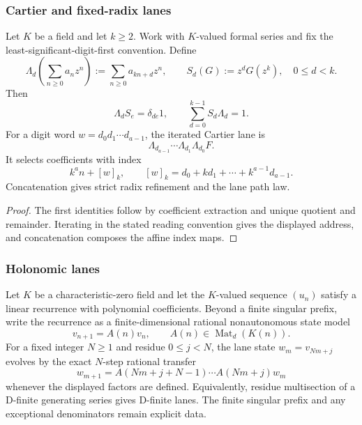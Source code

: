 \subsubsection{Cartier and fixed-radix lanes}

\begin{proposition}
\label{prop:block15-cartier-specialization}
Let \(K\) be a field and let \(k\ge2\).  Work with \(K\)-valued formal
series and fix the least-significant-digit-first convention.  Define
\[
 \Lambda_d\left(\sum_{n\ge0}a_nz^n\right)
 :=\sum_{n\ge0}a_{kn+d}z^n,
 \qquad
 S_d(G):=z^dG(z^k),
 \quad 0\le d<k.
\]
Then
\[
 \Lambda_dS_e=\delta_{de}1,
 \qquad
 \sum_{d=0}^{k-1}S_d\Lambda_d=1.
\]
For a digit word \(w=d_0d_1\cdots d_{a-1}\), the iterated Cartier lane is
\[
 \Lambda_{d_{a-1}}\cdots\Lambda_{d_1}\Lambda_{d_0}F.
\]
It selects coefficients with index
\[
 k^an+[w]_k,
 \qquad
 [w]_k=d_0+kd_1+\cdots+k^{a-1}d_{a-1}.
\]
Concatenation gives strict radix refinement and the lane path law.
\end{proposition}

\begin{proof}
The first identities follow by coefficient extraction and unique quotient and
remainder.  Iterating in the stated reading convention gives the displayed
address, and concatenation composes the affine index maps.
\end{proof}

\subsubsection{Holonomic lanes}

\begin{proposition}
\label{prop:block15-holonomic-specialization}
Let \(K\) be a characteristic-zero field and let the \(K\)-valued sequence
\((u_n)\) satisfy a linear
recurrence with polynomial coefficients.  Beyond a finite singular prefix,
write the recurrence as a finite-dimensional rational nonautonomous state
model
\[
 v_{n+1}=A(n)v_n,
 \qquad A(n)\in\operatorname{Mat}_d(K(n)).
\]
For a fixed integer \(N\ge1\) and residue \(0\le j<N\), the lane state
\(w_m=v_{Nm+j}\) evolves by the exact \(N\)-step rational transfer
\[
 w_{m+1}
 =
 A(Nm+j+N-1)\cdots A(Nm+j)w_m
\]
whenever the displayed factors are defined.  Equivalently, residue
multisection of a D-finite generating series gives D-finite lanes.  The finite
singular prefix and any exceptional denominators remain explicit data.
\end{proposition}

